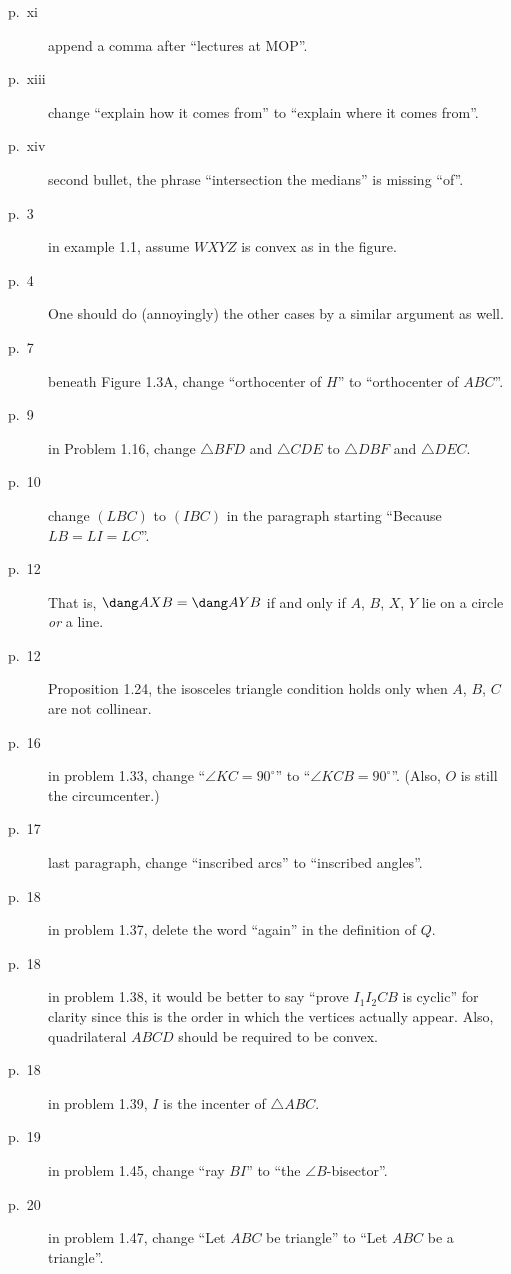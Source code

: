 \documentclass[11pt]{scrartcl}
\begin{document}
\begin{description}

\item[p.\  xi] append a comma after ``lectures at MOP''.
\item[p.\  xiii] change ``explain how it comes from'' to ``explain where it comes from''.
\item[p.\  xiv] second bullet, the phrase ``intersection the medians'' is missing ``of''.
\item[p.\   3] in example 1.1, assume $WXYZ$ is convex as in the figure.
\item[p.\   4] 
  One should do (annoyingly) the other cases by a similar argument as well.
\item[p.\   7] beneath Figure 1.3A, change ``orthocenter of $H$'' to ``orthocenter of $ABC$''.
\item[p.\   9] in Problem 1.16, change $\triangle BFD$ and $\triangle CDE$
  to $\triangle DBF$ and $\triangle DEC$.
\item[p.\  10] change $(LBC)$ to $(IBC)$ in the paragraph starting ``Because $LB=LI=LC$''.
\item[p.\  12] 
  That is, $\dang AXB = \dang AYB$ if and only if $A$, $B$, $X$, $Y$ lie on
  a circle \emph{or} a line.
\item[p.\  12] Proposition 1.24, the isosceles triangle condition holds
  only when $A$, $B$, $C$ are not collinear.
\item[p.\  16] in problem 1.33, change ``$\angle KC=90^{\circ}$'' to ``$\angle KCB=90^{\circ}$''.
  (Also, $O$ is still the circumcenter.)
\item[p.\  17] last paragraph, change ``inscribed arcs'' to ``inscribed angles''.
\item[p.\  18] in problem 1.37, delete the word ``again'' in the definition of $Q$.
\item[p.\  18] in problem 1.38, it would be better to say
  ``prove $I_1 I_2 C B$ is cyclic'' for clarity
  since this is the order in which the vertices actually appear.
  Also, quadrilateral $ABCD$ should be required to be convex.
\item[p.\  18] in problem 1.39, $I$ is the incenter of $\triangle ABC$.
\item[p.\  19] in problem 1.45, change ``ray $BI$'' to ``the $\angle B$-bisector''.
\item[p.\  20] in problem 1.47, change ``Let $ABC$ be triangle'' to ``Let $ABC$ be a triangle''.

\end{description}
\end{document}
